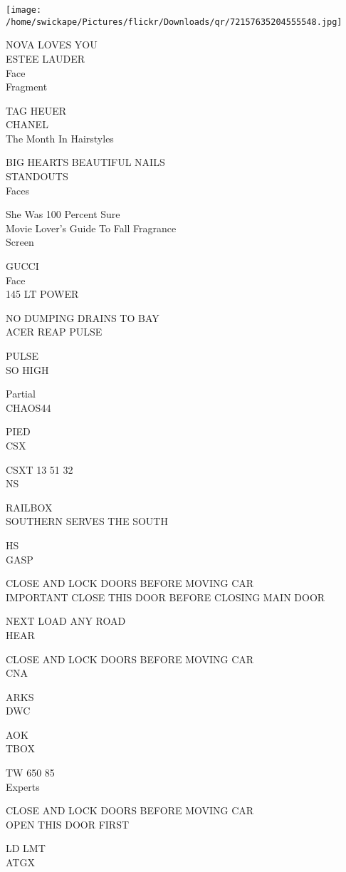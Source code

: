 \documentclass[10pt,letterpaper]{article}
\begin{document}
\texttt{[image: /home/swickape/Pictures/flickr/Downloads/qr/72157635204555548.jpg]}


NOVA LOVES YOU\\
ESTEE LAUDER\\
Face\\
Fragment

TAG HEUER\\
CHANEL\\
The Month In Hairstyles

BIG HEARTS BEAUTIFUL NAILS\\
STANDOUTS\\
Faces

She Was 100 Percent Sure\\
Movie Lover's Guide To Fall Fragrance\\
Screen

GUCCI\\
Face\\
145 LT POWER

NO DUMPING DRAINS TO BAY\\
ACER REAP PULSE

PULSE\\
SO HIGH

Partial\\
CHAOS44

PIED\\
CSX

CSXT 13 51 32\\
NS

RAILBOX\\
SOUTHERN SERVES THE SOUTH

HS\\
GASP

CLOSE AND LOCK DOORS BEFORE MOVING CAR\\
IMPORTANT CLOSE THIS DOOR BEFORE CLOSING MAIN DOOR

NEXT LOAD ANY ROAD\\
HEAR

CLOSE AND LOCK DOORS BEFORE MOVING CAR\\
CNA

ARKS\\
DWC

AOK\\
TBOX

TW 650 85\\
Experts

CLOSE AND LOCK DOORS BEFORE MOVING CAR\\
OPEN THIS DOOR FIRST

LD LMT\\
ATGX
\end{document}
